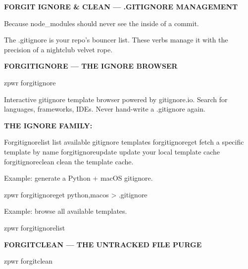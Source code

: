 \documentclass[11pt,a4paper,twoside]{book}
\begin{document}
\vspace{10pt}
{\large\bfseries\color{neoncyan} FORGIT IGNORE \& CLEAN — .GITIGNORE MANAGEMENT}\vspace{6pt}

Because node\_modules should never see the inside of a commit.

The .gitignore is your repo's bouncer list. These verbs manage it with the precision of a nightclub velvet rope.


\vspace{12pt}
{\bfseries\color{neonyellow} FORGITIGNORE — THE IGNORE BROWSER}\vspace{4pt}

\begin{codebox}
\color{neongreen}zpwr forgitignore\\
\end{codebox}

Interactive gitignore template browser powered by gitignore.io. Search for languages, frameworks, IDEs. Never hand-write a .gitignore again.


\vspace{12pt}
{\bfseries\color{neonyellow} THE IGNORE FAMILY:}\vspace{4pt}

Forgitignorelist     list available gitignore templates forgitignoreget      fetch a specific template by name forgitignoreupdate   update your local template cache forgitignoreclean    clean the template cache.

Example: generate a Python + macOS gitignore.

\begin{codebox}
\color{neongreen}zpwr forgitignoreget python,macos > .gitignore\\
\end{codebox}

Example: browse all available templates.

\begin{codebox}
\color{neongreen}zpwr forgitignorelist\\
\end{codebox}


\vspace{12pt}
{\bfseries\color{neonyellow} FORGITCLEAN — THE UNTRACKED FILE PURGE}\vspace{4pt}

\begin{codebox}
\color{neongreen}zpwr forgitclean\\
\end{codebox}
\end{document}
